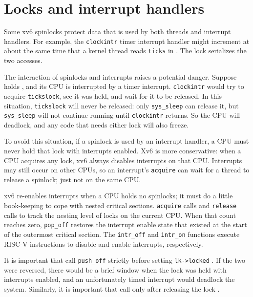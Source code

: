 \section{Locks and interrupt handlers}

Some xv6 spinlocks protect data that is used by
both threads and interrupt handlers.
For example, the
\lstinline{clockintr}
timer interrupt handler might increment
at about the same time that a kernel
thread reads
\lstinline{ticks} 
in
.
The lock
serializes the two accesses.

The interaction of spinlocks and interrupts raises a potential danger.
Suppose
holds
,
and its CPU is interrupted by a timer interrupt.
\lstinline{clockintr}
would try to acquire
\lstinline{tickslock},
see it was held, and wait for it to be released.
In this situation,
\lstinline{tickslock}
will never be released: only
\lstinline{sys_sleep}
can release it, but
\lstinline{sys_sleep}
will not continue running until
\lstinline{clockintr}
returns.
So the CPU will deadlock, and any code
that needs either lock will also freeze.

To avoid this situation, if a spinlock is used by an interrupt handler,
a CPU must never hold that lock with interrupts enabled.
Xv6 is more conservative: when a CPU acquires any
lock, xv6 always disables interrupts on that CPU.
Interrupts may still occur on other CPUs, so 
an interrupt's
\lstinline{acquire}
can wait for a thread to release a spinlock; just not on the same CPU.

xv6 re-enables interrupts when a CPU holds no spinlocks; it must
do a little book-keeping to cope with nested critical sections.
\lstinline{acquire}
calls
and
\lstinline{release}
calls
to track the nesting level of locks on the current CPU.
When that count reaches zero,
\lstinline{pop_off} 
restores the interrupt enable state that existed 
at the start of the outermost critical section.
The
\lstinline{intr_off}
and
\lstinline{intr_on}
functions execute RISC-V instructions to disable and enable
interrupts, respectively.

It is important that
call
\lstinline{push_off}
strictly before setting
\lstinline{lk->locked}
.
If the two were reversed, there would be
a brief window when the lock
was held with interrupts enabled, and
an unfortunately timed interrupt would deadlock the system.
Similarly, it is important that
call
only after 
releasing the lock
.

